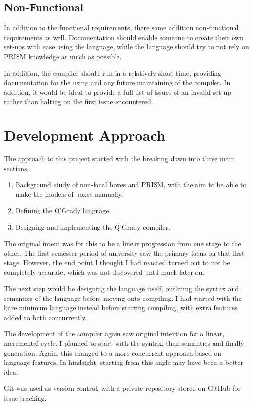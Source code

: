 \documentclass[report.tex]{subfiles}
\begin{document}
\subsection{Non-Functional} %
\label{sub:non_functional}
In addition to the functional requirements, there some addition non-functional
requirements as well. Documentation should enable someone to create their own
set-ups with ease using the language, while the language should try to not rely
on PRISM knowledge as much as possible.

In addition, the compiler should run in a relatively short time, providing
documentation for the using and any future maintaining of the compiler. In
addition, it would be ideal to provide a full list of issues of an invalid
set-up rather than halting on the first issue encountered.

\section{Development Approach} %
\label{sec:development_approach}
The approach to this project started with the breaking down into three main
sections.
\begin{enumerate}
    \item Background study of non-local boxes and PRISM, with the aim to be able
    to make the models of boxes manually.
    \item Defining the Q'Grady language.
    \item Designing and implementing the Q'Grady compiler.
\end{enumerate}

The original intent was for this to be a linear progression from one stage to
the other. The first semester period of university saw the primary focus on that
first stage. However, the end point I thought I had reached turned out to not
be completely accurate, which was not discovered until much later on.

The next step would be designing the language itself, outlining the syntax
and semantics of the language before moving onto compiling. I had started with
the bare minimum language instead before starting compiling, with extra features
added to both concurrently.

The development of the compiler again saw original intention for a linear,
incremental cycle. I planned to start with the syntax, then semantics and
finally generation. Again, this changed to a more concurrent approach based on
language features. In hindsight, starting from this angle may have been a
better idea.

Git was used as version control, with a private repository stored on GitHub for
issue tracking.
\newpage
\end{document}
